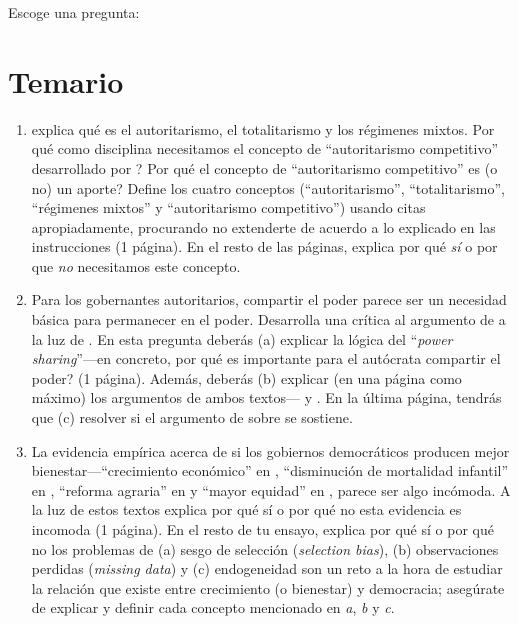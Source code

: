 \documentclass[onesided]{article}\usepackage[]{graphicx}\usepackage[]{color}
\begin{document}
Escoge una pregunta:

\section*{Temario}

\begin{enumerate}
	\item \textcite{Linz2000} explica qu\'e es el autoritarismo, el totalitarismo y los r\'egimenes mixtos. Por qu\'e como disciplina necesitamos el concepto de ``autoritarismo competitivo'' desarrollado por \textcite{Levitsky2002}? Por qu\'e el concepto de ``autoritarismo competitivo'' es (o no) un aporte?  Define los cuatro conceptos (``autoritarismo'', ``totalitarismo'', ``r\'egimenes mixtos'' y ``autoritarismo competitivo'') usando citas apropiadamente, procurando no extenderte de acuerdo a lo explicado en las instrucciones (1 p\'agina). En el resto de las p\'aginas, explica por qu\'e \emph{s\'i} o por que \emph{no} necesitamos este concepto. 
  
  \item Para los gobernantes autoritarios, compartir el poder parece ser un necesidad b\'asica para permanecer en el poder. Desarrolla una cr\'itica al argumento de \textcite{Gandhi:2007et} a la luz de \textcite{Magaloni2008}. En esta pregunta deber\'as (a) explicar la l\'ogica del ``\emph{power sharing}''---en concreto,  por qu\'e es importante para el aut\'ocrata compartir el poder? (1 p\'agina). Adem\'as, deber\'as (b) explicar (en una p\'agina como m\'aximo) los argumentos de ambos textos---\textcite{Gandhi:2007et} y \textcite{Magaloni2008}. En la \'ultima p\'agina, tendr\'as que (c) resolver si el argumento de \textcite{Magaloni2008} sobre \textcite{Gandhi:2007et} se sostiene.
  
  \item La evidencia emp\'irica acerca de si los gobiernos democr\'aticos producen mejor bienestar---``crecimiento econ\'omico'' en \textcite{Przeworski1993}, ``disminuci\'on de mortalidad infantil'' en \textcite{Ross2006}, ``reforma agraria'' en \textcite{Albertus:2015aa} y ``mayor equidad'' en \textcite{Bahamonde2021}, parece ser algo inc\'omoda. A la luz de estos textos explica por qu\'e s\'i o por qu\'e no esta evidencia es incomoda (1 p\'agina). En el resto de tu ensayo, explica por qu\'e s\'i o por qu\'e no los problemas de (a) sesgo de selecci\'on (\emph{selection bias}), (b) observaciones perdidas (\emph{missing data}) y (c) endogeneidad son un reto a la hora de estudiar la relaci\'on que existe entre crecimiento (o bienestar) y democracia; aseg\'urate de explicar y definir cada concepto mencionado en \emph{a}, \emph{b} y \emph{c}.
\end{enumerate}



\newpage
{}
\setcounter{page}{1}
\printbibliography
\end{document}
